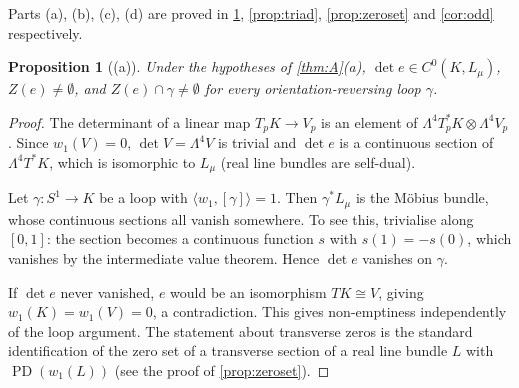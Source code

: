 \documentclass[11pt]{article}
\theoremstyle{canonmath}
\theoremstyle{canonpostulate}
\theoremstyle{canonproposition}
\theoremstyle{canonmath}
\newtheorem{proposition*}[theorem]{Proposition}
\theoremstyle{canonproposition}
\providecommand{\Lmu}{\mathcal{L}_\mu}
\providecommand{\Vb}{\mathcal{V}}
\providecommand{\PD}{\operatorname{PD}}
\providecommand{\Klein}{\mathcal{K}}
\def\mathcal#1{#1}%
\begin{document}
Parts (a), (b), (c), (d) are proved in \cref{prop:obstruction}, \cref{prop:triad}, \cref{prop:zeroset} and \cref{cor:odd} respectively.

\begin{proposition*}[(a)]\label{prop:obstruction}
Under the hypotheses of \cref{thm:A}(a), $\det e \in C^0(\Klein, \Lmu)$, $Z(e) \neq \emptyset$, and $Z(e) \cap \gamma \neq \emptyset$ for every orientation-reversing loop $\gamma$.
\end{proposition*}

\begin{proof}
The determinant of a linear map $T_p\Klein \to \Vb_p$ is an element of $\Lambda^4T_p^*\Klein \otimes \Lambda^4\Vb_p$. Since $w_1(\Vb) = 0$, $\det\Vb = \Lambda^4\Vb$ is trivial and $\det e$ is a continuous section of $\Lambda^4T^*\Klein$, which is isomorphic to $\Lmu$ (real line bundles are self-dual).

Let $\gamma: S^1 \to \Klein$ be a loop with $\langle w_1, [\gamma]\rangle = 1$. Then $\gamma^*\Lmu$ is the Möbius bundle, whose continuous sections all vanish somewhere. To see this, trivialise along $[0,1]$: the section becomes a continuous function $s$ with $s(1) = -s(0)$, which vanishes by the intermediate value theorem. Hence $\det e$ vanishes on $\gamma$.

If $\det e$ never vanished, $e$ would be an isomorphism $T\Klein \cong \Vb$, giving $w_1(\Klein) = w_1(\Vb) = 0$, a contradiction. This gives non-emptiness independently of the loop argument. The statement about transverse zeros is the standard identification of the zero set of a transverse section of a real line bundle $L$ with $\PD(w_1(L))$ (see the proof of \cref{prop:zeroset}).
\end{proof}
\end{document}
